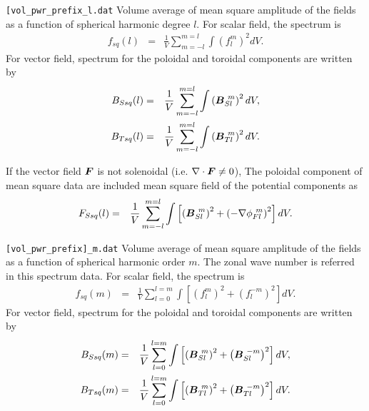 \begin{description}
\item{\tt [vol\_pwr\_prefix\_l.dat}  Volume average of mean square amplitude of the fields as a function of spherical harmonic degree $l$. For scalar field, the spectrum is
%
\begin{eqnarray}
f_{sq}(l) &=& \frac{1}{V} \sum_{m=-l}^{m=l} \int \left({f_{l}^{m}} \right)^{2} dV.
\nonumber
\end{eqnarray}
%
For vector field, spectrum for the poloidal and toroidal components are written by 
%
\begin{eqnarray}
B_{Ssq}(l) &=& \frac{1}{V} \sum_{m=-l}^{m=l} \int \left(\mbox{\boldmath$B$}_{Sl}^{\ m} \right)^{2} dV,
\nonumber \\
B_{Tsq}(l) &=& \frac{1}{V} \sum_{m=-l}^{m=l} \int \left(\mbox{\boldmath$B$}_{Tl}^{\ m} \right)^{2} dV.
\nonumber
\end{eqnarray}

If the vector field $\mbox{\boldmath$F$}$ is not solenoidal (i.e. $\nabla \cdot \mbox{\boldmath$F$} \neq 0$), The poloidal component of mean square data are included mean square field of the potential components as
%
\begin{eqnarray}
F_{Ssq}(l) &=& \frac{1}{V} \sum_{m=-l}^{m=l} \int \left[\left(\mbox{\boldmath$B$}_{Sl}^{\ m} \right)^{2}
 + \left(-\nabla \phi_{Fl}^{\ m} \right)^{2} \right] dV.
\nonumber
\end{eqnarray}
%

%
\item{\tt [vol\_pwr\_prefix]\_m.dat} Volume average of mean square amplitude of the fields as a function of spherical harmonic order $m$. The zonal wave number is referred in this spectrum data. For scalar field, the spectrum is
\begin{eqnarray}
f_{sq}(m) &=& \frac{1}{V} \sum_{l=0}^{l=m} \int \left[ \left(f_{l}^{m} \right)^{2}
 + \left( f_{l}^{-m} \right)^{2} \right] dV.
\nonumber
\end{eqnarray}
For vector field, spectrum for the poloidal and toroidal components are written by 
\begin{eqnarray}
B_{Ssq}(m) &=& \frac{1}{V} \sum_{l=0}^{l=m} \int \left[\left(\mbox{\boldmath$B$}_{Sl}^{\ m} \right)^{2} 
 + \left(\mbox{\boldmath$B$}_{Sl}^{\ -m} \right)^{2}  \right] dV,
\nonumber \\
B_{Tsq}(m) &=& \frac{1}{V} \sum_{l=0}^{l=m} \int \left[\left(\mbox{\boldmath$B$}_{Tl}^{\ m} \right)^{2} 
 + \left(\mbox{\boldmath$B$}_{Tl}^{\ -m} \right)^{2}  \right] dV.
\nonumber
\end{eqnarray}


\end{description}
